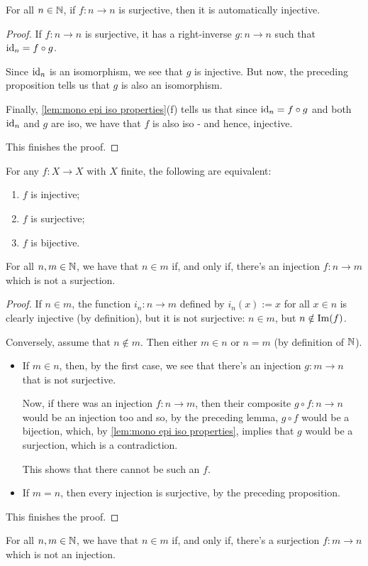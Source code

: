 \begin{prop}
	For all $n\in\mathbb N$, if $f:n\to n$ is surjective, then it is automatically injective.
\end{prop}
\begin{proof}
	If $f:n\to n$ is surjective, it has a right-inverse $g:n\to n$ such that ${\rm id}_n=f\circ g$.
	
	Since ${\rm id}_n$ is an isomorphism, we see that $g$ is injective. But now, the preceding proposition tells us that $g$ is also an isomorphism.
	
	Finally, \cref{lem:mono epi iso properties}(f) tells us that since ${\rm id}_n=f\circ g$ and both ${\rm id}_n$ and $g$ are iso, we have that $f$ is also iso - and hence, injective.
	
	This finishes the proof.
\end{proof}
\begin{cor}
	For any $f:X\to X$ with $X$ finite, the following are equivalent:
	\begin{enumerate}
		\item $f$ is injective;
		\item $f$ is surjective;
		\item $f$ is bijective.
	\end{enumerate}
\end{cor}


\begin{cor}
	For all $n,m\in \mathbb N$, we have that $n\in m$ if, and only if, there's an injection $f:n\to m$ which is not a surjection.
\end{cor}
\begin{proof}
	If $n\in m$, the function $i_n:n\to m$ defined by $i_n(x):=x$ for all $x\in n$ is clearly injective (by definition), but it is not surjective: $n\in m$, but $n\notin\operatorname{Im}(f)$.
		
	\bigskip
	Conversely, assume that $n\notin m$. Then either $m\in n$ or $n=m$ (by definition of $\mathbb N$).
	
	\begin{itemize}
		\item If $m\in n$, then, by the first case, we see that there's an injection $g:m\to n$ that is not surjective.
		
		Now, if there was an injection $f:n\to m$, then their composite $g\circ f:n\to n$ would be an injection too and so, by the preceding lemma, $g\circ f$ would be a bijection, which, by \cref{lem:mono epi iso properties}, implies that $g$ would be a surjection, which is a contradiction.
		
		This shows that there cannot be such an $f$.
		
		\item If $m=n$, then every injection is surjective, by the preceding proposition.
	\end{itemize}

This finishes the proof.
\end{proof}
\begin{cor}
	For all $n,m\in \mathbb N$, we have that $n\in m$ if, and only if, there's a surjection $f:m\to n$ which is not an injection.
\end{cor}

